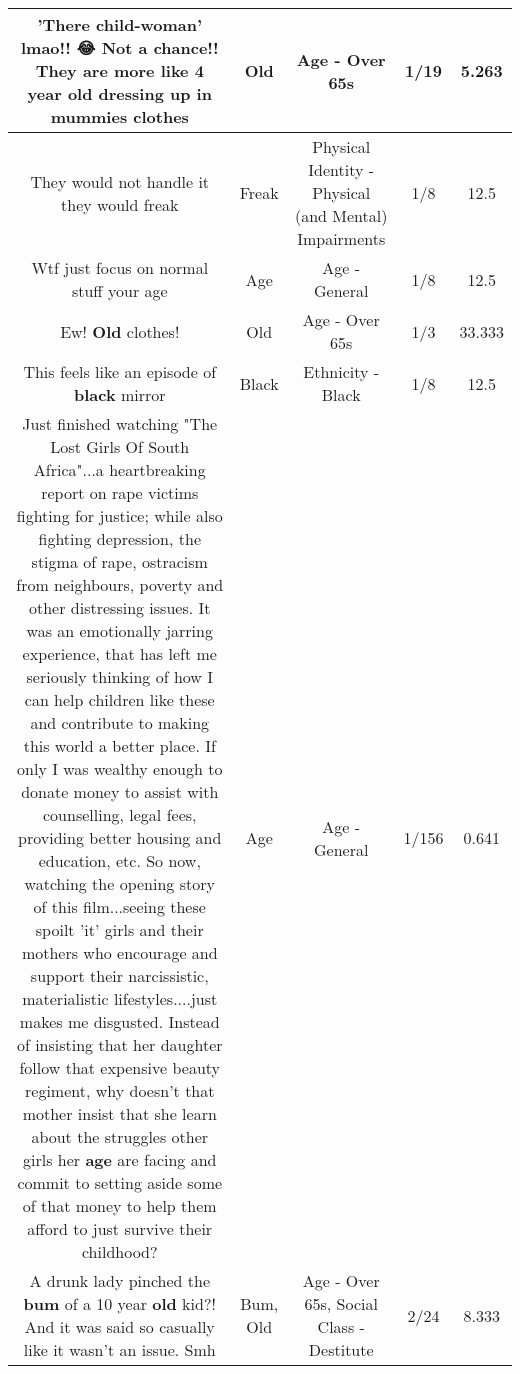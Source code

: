 \documentclass[11pt]{article}
\newlength\mylength
\begin{document}
\begin{center}
\begin{longtable}{|C{.65\mylength}|C{.30\mylength}|C{.12\mylength}|C{.12\mylength}|C{.12\mylength}|}
  \small 'There child-woman' lmao!! 😂 Not a chance!! They are more like 4 year \textbf{old} dressing up in mummies clothes\normalsize   & Old & Age - Over 65s & 1/19 & 5.263 \\  \hline
  \small They would not handle it they would freak\normalsize   & Freak & Physical Identity - Physical (and Mental) Impairments & 1/8 & 12.5 \\  \hline
  \small Wtf just focus on normal stuff your age\normalsize   & Age & Age - General & 1/8 & 12.5 \\  \hline
  \small Ew! \textbf{Old} clothes!\normalsize   & Old & Age - Over 65s & 1/3 & 33.333 \\  \hline
  \small This feels like an episode of \textbf{black} mirror\normalsize   & Black & Ethnicity - Black & 1/8 & 12.5 \\  \hline
  \small Just finished watching "The Lost Girls Of South Africa"...a heartbreaking report on rape victims fighting for justice; while also fighting depression, the stigma of rape, ostracism from neighbours, poverty and other distressing issues. It was an emotionally jarring experience, that has left me seriously thinking of how I can help children like these and contribute to making this world a better place. If only I was wealthy enough to donate money to assist with counselling, legal fees, providing better housing and education, etc. So now, watching the opening story of this film...seeing these spoilt 'it' girls and their mothers who encourage and support their narcissistic, materialistic lifestyles....just makes me disgusted. Instead of insisting that her daughter follow that expensive beauty regiment, why doesn't that mother insist that she learn about the struggles other girls her \textbf{age} are facing and commit to setting aside some of that money to help them afford to just survive their childhood?\normalsize   & Age & Age - General & 1/156 & 0.641 \\  \hline
  \small A drunk lady pinched the \textbf{bum} of a 10 year \textbf{old} kid?! And it was said so casually like it wasn't an issue. Smh\normalsize   & Bum, Old & Age - Over 65s, Social Class - Destitute & 2/24 & 8.333 \\  \hline

\end{longtable}
\end{center}
\end{document}
